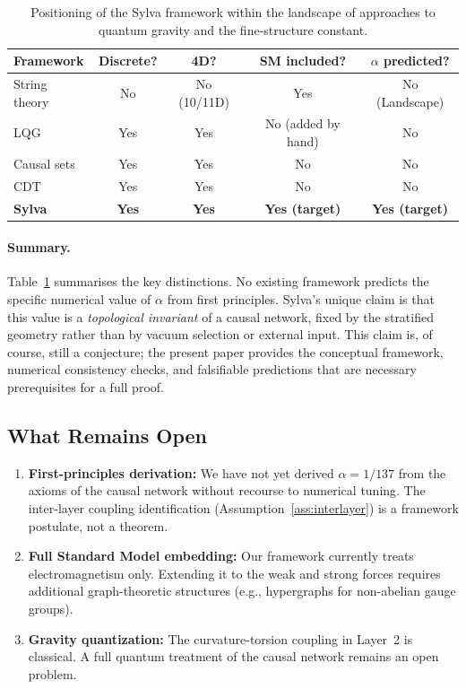 \documentclass[11pt,a4paper]{article}
\theoremstyle{definition}
\theoremstyle{remark}
\begin{document}
\begin{table}[htbp]
\centering
\caption{Positioning of the Sylva framework within the landscape of
approaches to quantum gravity and the fine-structure constant.}
\label{tab:positioning}
\begin{tabular}{@{}lcccc@{}}
\toprule
\textbf{Framework} & \textbf{Discrete?} & \textbf{4D?} & \textbf{SM included?} & \textbf{$\alpha$ predicted?} \\
\midrule
String theory & No  & No  (10/11D) & Yes & No (Landscape) \\
LQG            & Yes & Yes & No (added by hand) & No \\
Causal sets    & Yes & Yes & No & No \\
CDT            & Yes & Yes & No & No \\
\textbf{Sylva} & \textbf{Yes} & \textbf{Yes} & \textbf{Yes (target)} & \textbf{Yes (target)} \\
\bottomrule
\end{tabular}
\end{table}

\paragraph{Summary.}  Table~\ref{tab:positioning} summarises the key
distinctions.  No existing framework predicts the specific numerical value of
$\alpha$ from first principles.  Sylva's unique claim is that this value is a
\emph{topological invariant} of a causal network, fixed by the stratified
geometry rather than by vacuum selection or external input.  This claim is, of
course, still a conjecture; the present paper provides the conceptual framework,
numerical consistency checks, and falsifiable predictions that are necessary
prerequisites for a full proof.

\subsection{What Remains Open}\label{subsec:open}

\begin{enumerate}[noitemsep]
\item \textbf{First-principles derivation:} We have not yet derived
$\alpha = 1/137$ from the axioms of the causal network without recourse to
numerical tuning. The inter-layer coupling identification
(Assumption~\ref{ass:interlayer}) is a framework postulate, not a theorem.
\item \textbf{Full Standard Model embedding:} Our framework currently treats
electromagnetism only. Extending it to the weak and strong forces requires
additional graph-theoretic structures (e.g., hypergraphs for non-abelian gauge
groups).
\item \textbf{Gravity quantization:} The curvature-torsion coupling in
Layer~2 is classical. A full quantum treatment of the causal network remains
an open problem.
\end{enumerate}
\end{document}
